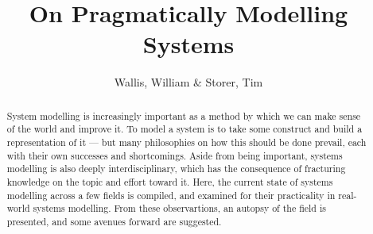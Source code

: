 \documentclass{tufte-handout}
\title{On Pragmatically Modelling Systems}
\author{Wallis, William \& Storer, Tim}
\date{}
\begin{document}
\maketitle

\begin{abstract}
  System modelling is increasingly important as a method by which we can make
  sense of the world and improve it. To model a system is to take some construct
  and build a representation of it --- but many philosophies on how this should
  be done prevail, each with their own successes and shortcomings. Aside from
  being important, systems modelling is also deeply interdisciplinary, which has
  the consequence of fracturing knowledge on the topic and effort toward it.
  Here, the current state of systems modelling across a few fields is compiled,
  and examined for their practicality in real-world systems modelling. From
  these observartions, an autopsy of the field is presented, and some avenues
  forward are suggested.
\end{abstract}














\end{document}
